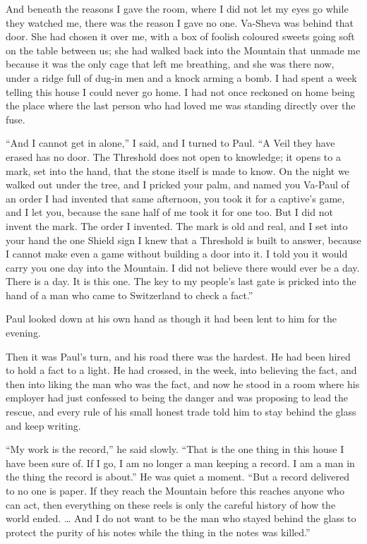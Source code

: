 And beneath the reasons I gave the room, where I did not let my eyes go while they watched me, there was the reason I gave no one. Va-Sheva was behind that door. She had chosen it over me, with a box of foolish coloured sweets going soft on the table between us; she had walked back into the Mountain that unmade me because it was the only cage that left me breathing, and she was there now, under a ridge full of dug-in men and a knock arming a bomb. I had spent a week telling this house I could never go home. I had not once reckoned on home being the place where the last person who had loved me was standing directly over the fuse.\par

``And I cannot get in alone,'' I said, and I turned to Paul. ``A Veil they have erased has no door. The Threshold does not open to knowledge; it opens to a mark, set into the hand, that the stone itself is made to know. On the night we walked out under the tree, and I pricked your palm, and named you Va-Paul of an order I had invented that same afternoon, you took it for a captive's game, and I let you, because the sane half of me took it for one too. But I did not invent the mark. The order I invented. The mark is old and real, and I set into your hand the one Shield sign I knew that a Threshold is built to answer, because I cannot make even a game without building a door into it. I told you it would carry you one day into the Mountain. I did not believe there would ever be a day. There is a day. It is this one. The key to my people's last gate is pricked into the hand of a man who came to Switzerland to check a fact.''\par

Paul looked down at his own hand as though it had been lent to him for the evening.\par

Then it was Paul's turn, and his road there was the hardest. He had been hired to hold a fact to a light. He had crossed, in the week, into believing the fact, and then into liking the man who was the fact, and now he stood in a room where his employer had just confessed to being the danger and was proposing to lead the rescue, and every rule of his small honest trade told him to stay behind the glass and keep writing.\par

``My work is the record,'' he said slowly. ``That is the one thing in this house I have been sure of. If I go, I am no longer a man keeping a record. I am a man in the thing the record is about.'' He was quiet a moment. ``But a record delivered to no one is paper. If they reach the Mountain before this reaches anyone who can act, then everything on these reels is only the careful history of how the world ended. \ldots{} And I do not want to be the man who stayed behind the glass to protect the purity of his notes while the thing in the notes was killed.''\par

